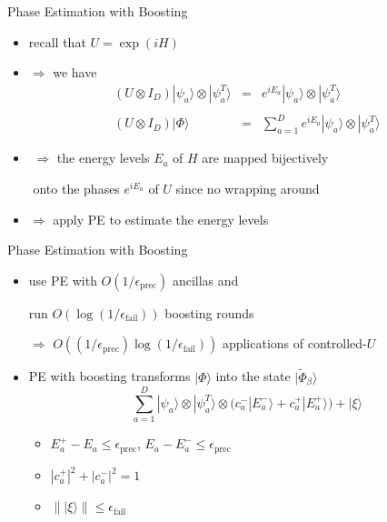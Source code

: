 \documentclass[slideColor]{prosper}
\renewcommand{\>}{\rangle}
\newcommand{\<}{\langle}
\begin{document}

\begin{slide}{Phase Estimation with Boosting}

\begin{itemize}
\item recall that $U=\exp(iH)$

\bigskip
\item $\Rightarrow$ we have
\begin{eqnarray*}
(U \otimes I_D) |\psi_a\> \otimes |\psi^T_a\> & = & e^{i E_a} |\psi_a\> \otimes |\psi^T_a\> \\
&& \\
(U \otimes I_D) |\Phi\>                       & = & \sum_{a=1}^D e^{i E_a} |\psi_a\> \otimes |\psi^T_a\>
\end{eqnarray*}

\item ${}$ $\Rightarrow$ the energy levels $E_a$ of $H$ are mapped bijectively

${}$ \phantom{$\Rightarrow$} onto the phases $e^{i E_a}$ of $U$ since no wrapping around

\medskip
\item $\Rightarrow$ apply PE to estimate the energy levels

\end{itemize}
\end{slide}


\begin{slide}{Phase Estimation with Boosting}

\begin{itemize}
\medskip
\item use PE with $O(1/\epsilon_{\textrm{prec}})$ ancillas and 

run $O(\log(1/\epsilon_{\textrm{fail}}))$ boosting rounds 

\medskip
$\Rightarrow$ $O((1/\epsilon_{\textrm{prec}})\log(1/\epsilon_{\textrm{fail}}))$ applications of controlled-$U$ 

\medskip
\item PE with boosting transforms $|\Phi\>$ into the state $|\tilde{\Phi}_\beta\>$
\[
\sum_{a=1}^D |\psi_a\> \otimes |\psi^T_a\> \otimes \Big( c_a^- |E_a^-\> + c_a^+ |E_a^+\> \Big) + |\xi\>
\]
\begin{itemize}
\item $E_a^+ - E_a  \le \epsilon_{\textrm{prec}}$, \quad $E_a - E_a^- \le \epsilon_{\textrm{prec}}$

\medskip
\item $|c_a^+|^2 + |c_a^-|^2=1$

\medskip
\item $\| |\xi\> \| \le \epsilon_{\textrm{fail}}$
\end{itemize}
\end{itemize}
\end{slide}
\end{document}

